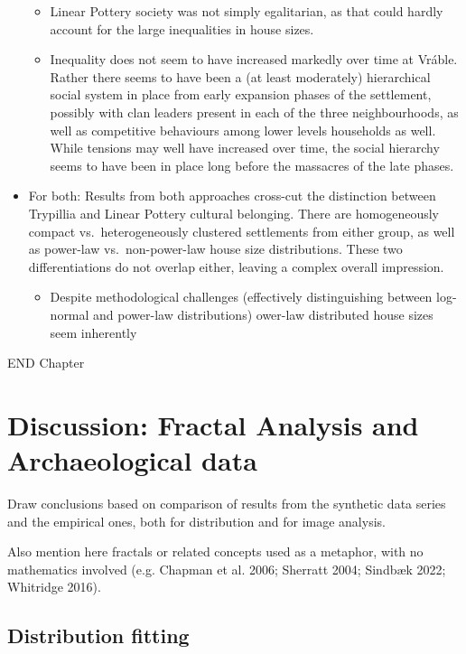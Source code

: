 \documentclass[
  12pt,
  a4paper, twoside]{book}
\providecommand{\tightlist}{%
  \setlength{\itemsep}{0pt}\setlength{\parskip}{0pt}}
\begin{document}
\begin{itemize}
  \begin{itemize}
  \item
    Linear Pottery society was not simply egalitarian, as that could hardly account for the large inequalities in house sizes.
  \item
    Inequality does not seem to have increased markedly over time at Vráble. Rather there seems to have been a (at least moderately) hierarchical social system in place from early expansion phases of the settlement, possibly with clan leaders present in each of the three neighbourhoods, as well as competitive behaviours among lower levels households as well. While tensions may well have increased over time, the social hierarchy seems to have been in place long before the massacres of the late phases.
  \end{itemize}
\item
  For both: Results from both approaches cross-cut the distinction between Trypillia and Linear Pottery cultural belonging. There are homogeneously compact vs.~heterogeneously clustered settlements from either group, as well as power-law vs.~non-power-law house size distributions. These two differentiations do not overlap either, leaving a complex overall impression.

  \begin{itemize}
  \tightlist
  \item
    Despite methodological challenges (effectively distinguishing between log-normal and power-law distributions) ower-law distributed house sizes seem inherently
  \end{itemize}
\end{itemize}

END Chapter

\hypertarget{disc-methods}{%
\chapter{Discussion: Fractal Analysis and Archaeological data}\label{disc-methods}}

Draw conclusions based on comparison of results from the synthetic data series and the empirical ones, both for distribution and for image analysis.

Also mention here fractals or related concepts used as a metaphor, with no mathematics involved (e.g. Chapman et al. 2006; Sherratt 2004; Sindbæk 2022; Whitridge 2016).

\hypertarget{distribution-fitting}{%
\section{Distribution fitting}\label{distribution-fitting}}
\end{document}
